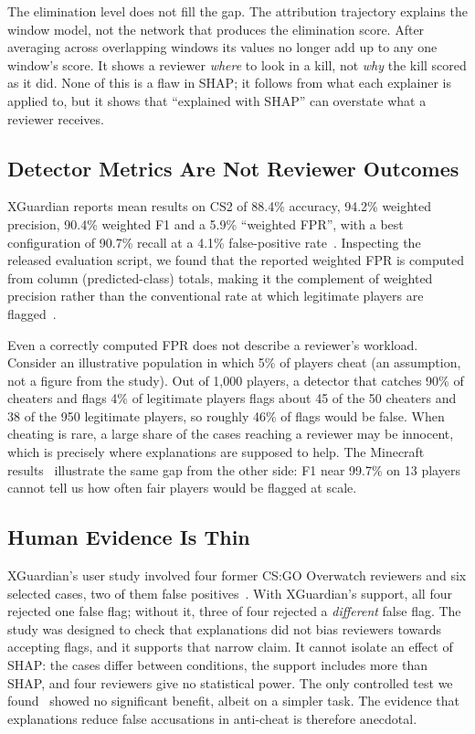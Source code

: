 \documentclass[conference]{IEEEtran}
\begin{document}
The elimination level does not fill the gap. The attribution trajectory explains the window model, not the network that produces the elimination score. 
After averaging across overlapping windows its values no longer add up to any one window's score. 
It shows a reviewer \emph{where} to look in a kill, not \emph{why} the kill scored as it did. 
None of this is a flaw in SHAP; it follows from what each explainer is applied to, but it shows that ``explained with SHAP'' can overstate what a reviewer receives.

\subsection{Detector Metrics Are Not Reviewer Outcomes}
XGuardian reports mean results on CS2 of 88.4\% accuracy, 94.2\% weighted precision, 90.4\% weighted F1 and a 5.9\% ``weighted FPR'', with a best configuration of 90.7\% recall at a 4.1\% false-positive rate~\cite{zhang2026xguardian}.
Inspecting the released evaluation script, we found that the reported weighted FPR is computed from column (predicted-class) totals, making it the complement of weighted precision rather than the conventional rate at which legitimate players are flagged~\cite{zhang2026artifact}.

Even a correctly computed FPR does not describe a reviewer's workload. Consider an illustrative population in which 5\% of players cheat (an assumption, not a figure from the study). 
Out of 1{,}000 players, a detector that catches 90\% of cheaters and flags 4\% of legitimate players flags about 45 of the 50 cheaters and 38 of the 950 legitimate players, so roughly 46\% of flags would be false. When cheating is rare, a large share of the cases reaching a reviewer may be innocent, which is precisely where explanations are supposed to help. The Minecraft results~\cite{sousa2025minecraft} illustrate the same gap from the other side: F1 near 99.7\% on 13 players cannot tell us how often fair players would be flagged at scale.

\subsection{Human Evidence Is Thin}
XGuardian's user study involved four former CS:GO Overwatch reviewers and six selected cases, two of them false positives~\cite{zhang2026xguardian}. With XGuardian's support, all four rejected one false flag; without it, three of four rejected a \emph{different} false flag. The study was designed to check that explanations did not bias reviewers towards accepting flags, and it supports that narrow claim. It cannot isolate an effect of SHAP: the cases differ between conditions, the support includes more than SHAP, and four reviewers give no statistical power. The only controlled test we found~\cite{weerts2019human} showed no significant benefit, albeit on a simpler task. The evidence that explanations reduce false accusations in anti-cheat is therefore anecdotal.
\end{document}
